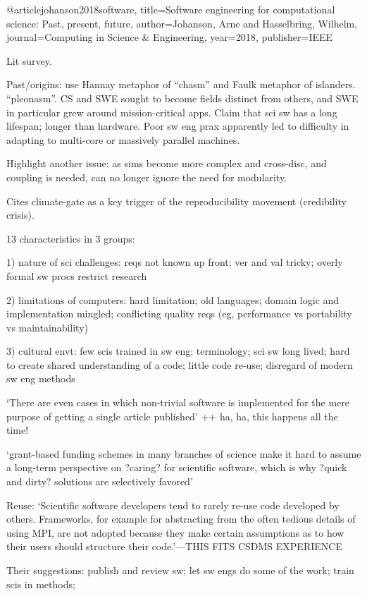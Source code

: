 \documentclass[12pt]{amsart}
\begin{document}
@article{johanson2018software,
  title={Software engineering for computational science: Past, present, future},
  author={Johanson, Arne and Hasselbring, Wilhelm},
  journal={Computing in Science \& Engineering},
  year={2018},
  publisher={IEEE}
}

Lit survey. 

Past/origins: use Hannay metaphor of ``chasm'' and Faulk metaphor of islanders. ``pleonasm''. CS and SWE sought to become fields distinct from others, and SWE in particular grew around mission-critical apps. Claim that sci sw has a long lifespan; longer than hardware. Poor sw eng prax apparently led to difficulty in adapting to multi-core or massively parallel machines.

Highlight another issue: as sims become more complex and cross-disc, and coupling is needed, can no longer ignore the need for modularity.

Cites climate-gate as a key trigger of the reproducibility movement (credibility crisis).

13 characteristics in 3 groups:

1) nature of sci challenges: reqs not known up front; ver and val tricky; overly formal sw procs restrict research

2) limitations of computers: hard limitation; old languages; domain logic and implementation mingled; conflicting quality reqs (eg, performance vs portability vs maintainability)

3) cultural envt: few scis trained in sw eng; terminology; sci sw long lived; hard to create shared understanding of a code; little code re-use; disregard of modern sw eng methods

`There are even cases in which non-trivial software is implemented for the mere purpose of getting a single article published' ++ ha, ha, this happens all the time!

`grant-based funding schemes in many branches of science make it hard to assume a long-term perspective on ?caring? for scientific software, which is why ?quick and dirty? solutions are selectively favored'

Reuse: `Scientific software developers tend to rarely re-use code developed by others. Frameworks, for example for abstracting from the often tedious details of using MPI, are not adopted because they make certain assumptions as to how their users should structure their code.'---THIS FITS CSDMS EXPERIENCE

Their suggestions: publish and review sw; let sw engs do some of the work; train scis in methods; 
\end{document}
